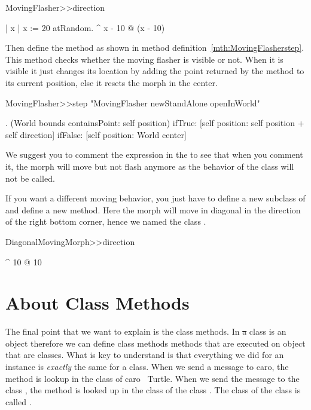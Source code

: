 \begin{method}
MovingFlasher>>direction
   
   | x |
   x := 20 atRandom.
   ^ x - 10 @ (x - 10)
\end{method}

Then define the method  as shown in method definition~\ref{mth:MovingFlasherstep}. This method checks whether the moving flasher is visible or not. When it is visible it just changes its location by adding the point returned by the method  to its current position, else it resets the morph in the center. 

\begin{method}\label{mth:MovingFlasherstep}
MovingFlasher>>step
   "MovingFlasher newStandAlone openInWorld"
   
   .
   (World bounds containsPoint: self position)
      ifTrue: [self position: self position + self direction]
      ifFalse: [self position: World center]
\end{method}

We suggest you to comment the  expression in the 
 to see that when you comment it, the morph will move but not flash anymore as the behavior of the class  will not be called.

If you want a different moving behavior, you just have to define a new subclass of  and define a new  method.  Here the morph will move in diagonal in the direction of the right bottom corner, hence we named the class . 

\begin{method}
DiagonalMovingMorph>>direction
   
   ^ 10 @ 10
\end{method}


\section{About Class Methods}
The final point that we want to explain is the class methods. 
In \st a class is an object therefore we can define class methods \ie 
methods that are executed on object that are classes. 
What is key to understand is that everything we did for an instance is \emph{exactly} the same for a class. When we send a message to caro, the method is lookup in the class of caro \ie\ Turtle. When we send the message  to the class , the method is looked up in the class of the class . The class of the class  is called .


